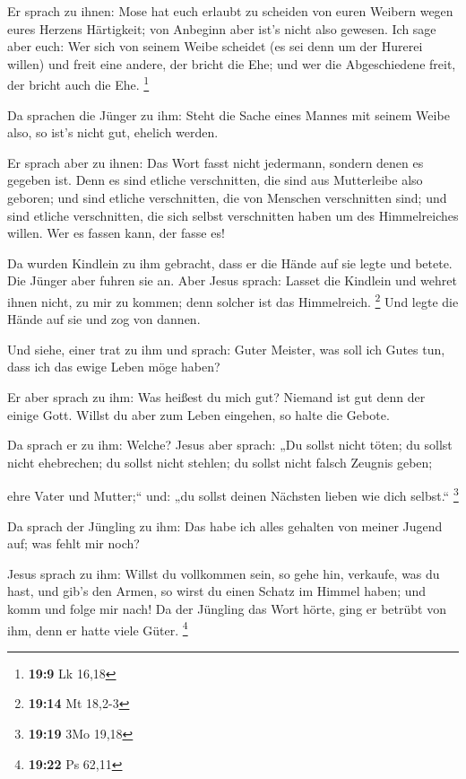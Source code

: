 Er sprach zu ihnen: Mose hat euch erlaubt zu scheiden von
euren Weibern wegen eures Herzens Härtigkeit; von Anbeginn aber ist's
nicht also gewesen.  Ich sage aber euch: Wer sich von seinem
Weibe scheidet (es sei denn um der Hurerei willen) und freit eine
andere, der bricht die Ehe; und wer die Abgeschiedene freit, der bricht
auch die Ehe. \footnote{\textbf{19:9} Lk 16,18}

 Da sprachen die Jünger zu ihm: Steht die Sache eines
Mannes mit seinem Weibe also, so ist's nicht gut, ehelich werden.

 Er sprach aber zu ihnen: Das Wort fasst nicht jedermann,
sondern denen es gegeben ist.  Denn es sind etliche
verschnitten, die sind aus Mutterleibe also geboren; und sind etliche
verschnitten, die von Menschen verschnitten sind; und sind etliche
verschnitten, die sich selbst verschnitten haben um des Himmelreiches
willen. Wer es fassen kann, der fasse es!

 Da wurden Kindlein zu ihm gebracht, dass er die Hände auf
sie legte und betete. Die Jünger aber fuhren sie an.  Aber
Jesus sprach: Lasset die Kindlein und wehret ihnen nicht, zu mir zu
kommen; denn solcher ist das Himmelreich. \footnote{\textbf{19:14} Mt
  18,2-3}  Und legte die Hände auf sie und zog von dannen.

 Und siehe, einer trat zu ihm und sprach: Guter Meister,
was soll ich Gutes tun, dass ich das ewige Leben möge haben?

 Er aber sprach zu ihm: Was heißest du mich gut? Niemand
ist gut denn der einige Gott. Willst du aber zum Leben eingehen, so
halte die Gebote.

 Da sprach er zu ihm: Welche? Jesus aber sprach: „Du sollst
nicht töten; du sollst nicht ehebrechen; du sollst nicht stehlen; du
sollst nicht falsch Zeugnis geben;

 ehre Vater und Mutter;`` und: „du sollst deinen Nächsten
lieben wie dich selbst.`` \footnote{\textbf{19:19} 3Mo 19,18}

 Da sprach der Jüngling zu ihm: Das habe ich alles gehalten
von meiner Jugend auf; was fehlt mir noch?

 Jesus sprach zu ihm: Willst du vollkommen sein, so gehe
hin, verkaufe, was du hast, und gib's den Armen, so wirst du einen
Schatz im Himmel haben; und komm und folge mir nach!  Da
der Jüngling das Wort hörte, ging er betrübt von ihm, denn er hatte
viele Güter. \footnote{\textbf{19:22} Ps 62,11}

